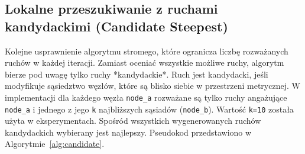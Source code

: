 \documentclass[12pt,a4paper]{article}
\begin{document}
\subsection{Lokalne przeszukiwanie z ruchami kandydackimi (Candidate Steepest)}
Kolejne usprawnienie algorytmu stromego, które ogranicza liczbę rozważanych ruchów w każdej iteracji. Zamiast oceniać wszystkie możliwe ruchy, algorytm bierze pod uwagę tylko ruchy *kandydackie*. Ruch jest kandydacki, jeśli modyfikuje sąsiedztwo węzłów, które są blisko siebie w przestrzeni metrycznej. W implementacji dla każdego węzła \texttt{node\_a} rozważane są tylko ruchy angażujące \texttt{node\_a} i jednego z jego \texttt{k} najbliższych sąsiadów (\texttt{node\_b}). Wartość \texttt{k=10} została użyta w eksperymentach. Spośród wszystkich wygenerowanych ruchów kandydackich wybierany jest najlepszy. Pseudokod przedstawiono w Algorytmie~\ref{alg:candidate}.
\end{document}
